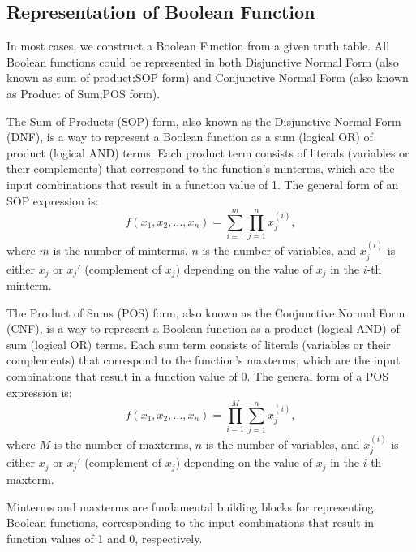     \subsection{Representation of Boolean Function}
    In most cases, we construct a Boolean Function from a given truth table. All Boolean functions could be represented in both
    Disjunctive Normal Form (also known as sum of product;SOP form) and Conjunctive Normal Form (also known as Product of Sum;POS form).
    \begin{definition}
        The Sum of Products (SOP) form, also known as the Disjunctive Normal Form (DNF), is a way to represent a Boolean function as a sum (logical OR) of product (logical AND) terms. Each product term consists of literals (variables or their complements) that correspond to the function's minterms, which are the input combinations that result in a function value of 1.
        The general form of an SOP expression is:
        \[f(x_1, x_2, \ldots, x_n) = \sum_{i=1}^{m} \prod_{j=1}^{n} x_j^{(i)},\]
        where $m$ is the number of minterms, $n$ is the number of variables, and $x_j^{(i)}$ is either $x_j$ or $x_j'$ (complement of $x_j$) depending on the value of $x_j$ in the $i$-th minterm.
    \end{definition}

    \begin{definition}
        The Product of Sums (POS) form, also known as the Conjunctive Normal Form (CNF), is a way to represent a Boolean function as a product (logical AND) of sum (logical OR) terms. Each sum term consists of literals (variables or their complements) that correspond to the function's maxterms, which are the input combinations that result in a function value of 0.
        The general form of a POS expression is:
        \[f(x_1, x_2, \ldots, x_n) = \prod_{i=1}^{M} \sum_{j=1}^{n} x_j^{(i)},\]
        where $M$ is the number of maxterms, $n$ is the number of variables, and $x_j^{(i)}$ is either $x_j$ or $x_j'$ (complement of $x_j$) depending on the value of $x_j$ in the $i$-th maxterm.
        \end{definition}
    \begin{remark}
        Minterms and maxterms are fundamental building blocks for representing Boolean functions, corresponding to the input combinations that result in function values of 1 and 0, respectively.
    \end{remark}

